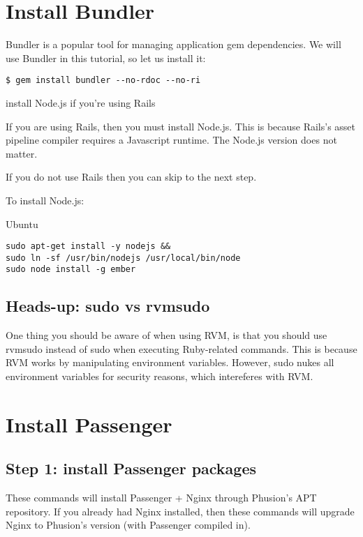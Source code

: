 \documentclass[11pt]{article}
\begin{document}
\section{Install Bundler}
\label{sec:org19b9729}

Bundler is a popular tool for managing application gem dependencies. We will use Bundler in this tutorial, so let us install it:

\begin{verbatim}
$ gem install bundler --no-rdoc --no-ri
\end{verbatim}

install Node.js if you're using Rails

If you are using Rails, then you must install Node.js. This is because Rails's asset pipeline compiler requires a Javascript runtime. The Node.js version does not matter.

If you do not use Rails then you can skip to the next step.

To install Node.js:

Ubuntu

\begin{verbatim}
sudo apt-get install -y nodejs &&
sudo ln -sf /usr/bin/nodejs /usr/local/bin/node
sudo node install -g ember
\end{verbatim}

\subsection{Heads-up: sudo vs rvmsudo}
\label{sec:orgecaf68d}

One thing you should be aware of when using RVM, is that you should use rvmsudo instead of sudo when executing Ruby-related commands. This is because RVM works by manipulating environment variables. However, sudo nukes all environment variables for security reasons, which intereferes with RVM.

\section{Install Passenger}
\label{sec:org0c46ee1}
\subsection{Step 1: install Passenger packages}
\label{sec:orgb324d84}

These commands will install Passenger + Nginx through Phusion's APT repository. If you already had Nginx installed, then these commands will upgrade Nginx to Phusion's version (with Passenger compiled in).
\end{document}
